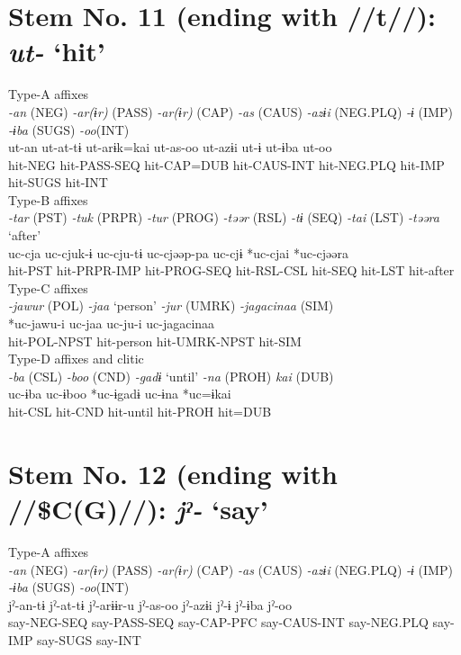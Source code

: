 \section{Stem No. 11 (ending with //t//): \textit{ut-} ‘hit’}

\ea Type-A affixes\\
\glll \textit{-an} (NEG)  \textit{-ar(ɨr)} (PASS)  \textit{-ar(ɨr)} (CAP)  \textit{-as} (CAUS)  \textit{-azɨi} (NEG.PLQ)  \textit{-ɨ} (IMP)  \textit{-ɨba} (SUGS)  \textit{-oo}(INT)\\
ut-an  ut-at-tɨ  ut-arɨk=kai  ut-as-oo  ut-azɨi  ut-ɨ  ut-ɨba  ut-oo\\
hit-NEG  hit-PASS-SEQ  hit-CAP=DUB  hit-CAUS-INT  hit-NEG.PLQ  hit-IMP  hit-SUGS  hit-INT\\


\ex Type-B affixes\\
\glll \textit{-tar} (PST)  \textit{-tuk} (PRPR)  \textit{-tur} (PROG)  \textit{-təər} (RSL)  \textit{-tɨ} (SEQ)  \textit{-tai} (LST)  \textit{-təəra} ‘after’\\
uc-cja  uc-cjuk-ɨ  uc-cju-tɨ  uc-cjəəp-pa  uc-cjɨ  *uc-cjai  *uc-cjəəra\\
hit-PST  hit-PRPR-IMP  hit-PROG-SEQ  hit-RSL-CSL  hit-SEQ  hit-LST  hit-after\\


\ex Type-C affixes\\
\glll \textit{-jawur} (POL)  \textit{-jaa} ‘person’  \textit{-jur} (UMRK)  \textit{-jagacinaa} (SIM)\\
*uc-jawu-i  uc-jaa  uc-ju-i  uc-jagacinaa\\
hit-POL-NPST  hit-person  hit-UMRK-NPST  hit-SIM\\


\ex Type-D affixes and clitic\\
\glll \textit{-ba} (CSL)  \textit{-boo} (CND)  \textit{-gadɨ} ‘until’  \textit{-na} (PROH)  \textit{kai} (DUB)\\
uc-ɨba  uc-ɨboo  *uc-ɨgadɨ  uc-ɨna  *uc=ɨkai\\
hit-CSL  hit-CND  hit-until  hit-PROH  hit=DUB\\
\z

\section{Stem No. 12 (ending with //\$C(G)//): \textit{jˀ-} ‘say’}

\ea Type-A affixes\\
\glll \textit{-an} (NEG)  \textit{-ar(ɨr)} (PASS)  \textit{-ar(ɨr)} (CAP)  \textit{-as} (CAUS)  \textit{-azɨi} (NEG.PLQ)  \textit{-ɨ} (IMP)  \textit{-ɨba} (SUGS)  \textit{-oo}(INT)\\
jˀ-an-tɨ  jˀ-at-tɨ  jˀ-arɨɨr-u  jˀ-as-oo  jˀ-azɨi  jˀ-ɨ  jˀ-ɨba  jˀ-oo\\
say-NEG-SEQ  say-PASS-SEQ  say-CAP-PFC  say-CAUS-INT  say-NEG.PLQ  say-IMP  say-SUGS  say-INT\\


